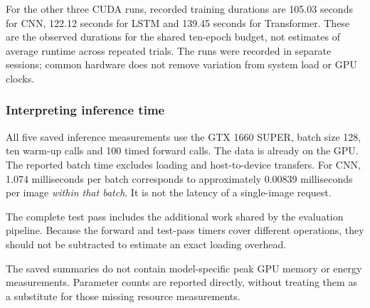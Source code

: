 For the other three CUDA runs, recorded training durations are 105.03 seconds for
CNN, 122.12 seconds for LSTM and 139.45 seconds for Transformer. These are the
observed durations for the shared ten-epoch budget, not estimates of average
runtime across repeated trials. The runs were recorded in separate sessions;
common hardware does not remove variation from system load or GPU clocks.

\subsubsection{Interpreting inference time}
All five saved inference measurements use the GTX 1660 SUPER, batch size 128,
ten warm-up calls and 100 timed forward calls. The data is already on the GPU.
The reported batch time excludes loading and host-to-device transfers.
For CNN, 1.074 milliseconds per batch corresponds to approximately
0.00839 milliseconds per image \emph{within that batch}. It is not the latency
of a single-image request.

The complete test pass includes the additional work shared by the evaluation
pipeline. Because the forward and test-pass timers cover different operations,
they should not be subtracted to estimate an exact loading overhead.

The saved summaries do not contain model-specific peak GPU memory or energy
measurements. Parameter counts are reported directly, without treating them
as a substitute for those missing resource measurements.
